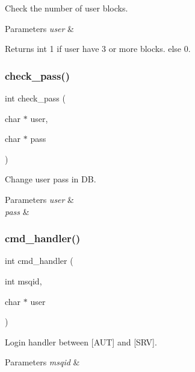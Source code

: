 Check the number of user blocks. 


\begin{DoxyParams}{Parameters}
{\em user} & \\
\hline
\end{DoxyParams}
\begin{DoxyReturn}{Returns}
int 1 if user have 3 or more blocks. else 0. 
\end{DoxyReturn}
\mbox{\label{auth_8h_ad8ec075d0149d64235490cebfdaebfe1}} 
\subsubsection{check\+\_\+pass()}
{\footnotesize\ttfamily int check\+\_\+pass (\begin{DoxyParamCaption}\item[{char $\ast$}]{user,  }\item[{char $\ast$}]{pass }\end{DoxyParamCaption})}



Change user pass in DB. 


\begin{DoxyParams}{Parameters}
{\em user} & \\
\hline
{\em pass} & \\
\hline
\end{DoxyParams}
\mbox{\label{auth_8h_ac577f045e4bf8abe2128eb727bf5edb7}} 
\subsubsection{cmd\+\_\+handler()}
{\footnotesize\ttfamily int cmd\+\_\+handler (\begin{DoxyParamCaption}\item[{int}]{msqid,  }\item[{char $\ast$}]{user }\end{DoxyParamCaption})}



Login handler between [A\+UT] and [S\+RV]. 


\begin{DoxyParams}{Parameters}
{\em msqid} & \\
\hline
\end{DoxyParams}
\mbox{\label{auth_8h_ab699bd210dfe5219d858aeb212650f47}} 
